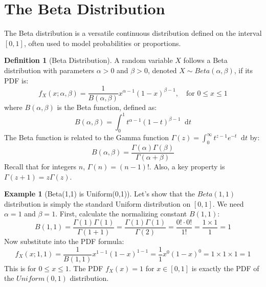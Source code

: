 \documentclass[11pt, letterpaper]{article}
\theoremstyle{plain} %
\theoremstyle{definition} %
\newtheorem{definition}[theorem]{Definition}
\newtheorem{example}[theorem]{Example}
\theoremstyle{remark} %
\newcommand{\dee}{\mathop{}\!\mathrm{d}} %
\newcommand{\BetaFunc}{B} %
\begin{document}
\section{The Beta Distribution}

The Beta distribution is a versatile continuous distribution defined on the interval $[0, 1]$, often used to model probabilities or proportions.

\begin{definition}[Beta Distribution]
A random variable $X$ follows a Beta distribution with parameters $\alpha > 0$ and $\beta > 0$, denoted $X \sim Beta(\alpha, \beta)$, if its PDF is:
\[ f_X(x; \alpha, \beta) = \frac{1}{\BetaFunc(\alpha, \beta)} x^{\alpha-1} (1-x)^{\beta-1}, \quad \text{for } 0 \le x \le 1 \]
where $\BetaFunc(\alpha, \beta)$ is the Beta function, defined as:
\[ \BetaFunc(\alpha, \beta) = \int_0^1 t^{\alpha-1} (1-t)^{\beta-1} \dee t \]
The Beta function is related to the Gamma function $\Gamma(z) = \int_0^\infty t^{z-1} e^{-t} \dee t$ by:
\[ \BetaFunc(\alpha, \beta) = \frac{\Gamma(\alpha)\Gamma(\beta)}{\Gamma(\alpha+\beta)} \]
Recall that for integers $n$, $\Gamma(n) = (n-1)!$. Also, a key property is $\Gamma(z+1) = z\Gamma(z)$.
\end{definition}

\begin{example}[Beta(1,1) is Uniform(0,1)] \label{ex:beta_uniform}
Let's show that the $Beta(1, 1)$ distribution is simply the standard Uniform distribution on $[0, 1]$.
We need $\alpha=1$ and $\beta=1$.
First, calculate the normalizing constant $\BetaFunc(1, 1)$:
\[ \BetaFunc(1, 1) = \frac{\Gamma(1)\Gamma(1)}{\Gamma(1+1)} = \frac{\Gamma(1)\Gamma(1)}{\Gamma(2)} = \frac{0! \cdot 0!}{1!} = \frac{1 \times 1}{1} = 1 \]
Now substitute into the PDF formula:
\[ f_X(x; 1, 1) = \frac{1}{\BetaFunc(1, 1)} x^{1-1} (1-x)^{1-1} = \frac{1}{1} x^0 (1-x)^0 = 1 \times 1 \times 1 = 1 \]
This is for $0 \le x \le 1$. The PDF $f_X(x) = 1$ for $x \in [0, 1]$ is exactly the PDF of the $Uniform(0, 1)$ distribution.
\end{example}
\end{document}
